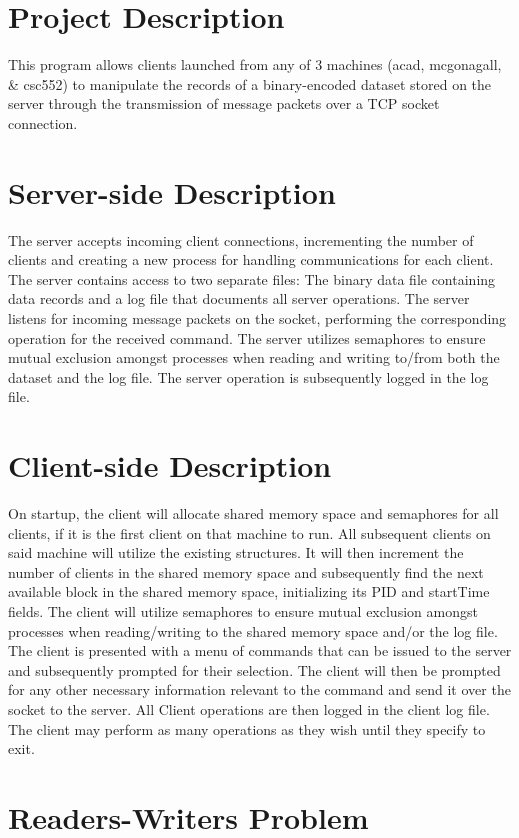 \hypertarget{index_proj_desc}{}\section{Project Description}\label{index_proj_desc}
This program allows clients launched from any of 3 machines (acad, mcgonagall, \& csc552) to manipulate the records of a binary-\/encoded dataset stored on the server through the transmission of message packets over a T\-C\-P socket connection. \hypertarget{index_server_desc}{}\section{Server-\/side Description}\label{index_server_desc}
The server accepts incoming client connections, incrementing the number of clients and creating a new process for handling communications for each client. The server contains access to two separate files\-: The binary data file containing data records and a log file that documents all server operations. The server listens for incoming message packets on the socket, performing the corresponding operation for the received command. The server utilizes semaphores to ensure mutual exclusion amongst processes when reading and writing to/from both the dataset and the log file. The server operation is subsequently logged in the log file. \hypertarget{index_client_desc}{}\section{Client-\/side Description}\label{index_client_desc}
On startup, the client will allocate shared memory space and semaphores for all clients, if it is the first client on that machine to run. All subsequent clients on said machine will utilize the existing structures. It will then increment the number of clients in the shared memory space and subsequently find the next available block in the shared memory space, initializing its P\-I\-D and start\-Time fields. The client will utilize semaphores to ensure mutual exclusion amongst processes when reading/writing to the shared memory space and/or the log file. The client is presented with a menu of commands that can be issued to the server and subsequently prompted for their selection. The client will then be prompted for any other necessary information relevant to the command and send it over the socket to the server. All Client operations are then logged in the client log file. The client may perform as many operations as they wish until they specify to exit. \hypertarget{index_readWrite}{}\section{Readers-\/\-Writers Problem}\label{index_readWrite}
